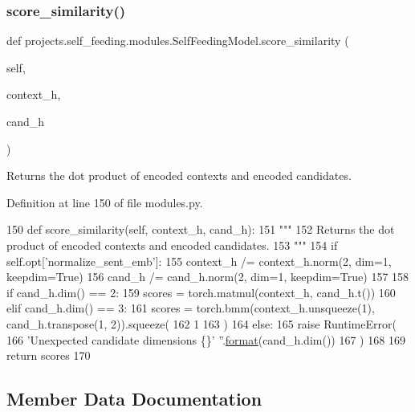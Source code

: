 \subsubsection{\texorpdfstring{score\+\_\+similarity()}{score\_similarity()}}
{\footnotesize\ttfamily def projects.\+self\+\_\+feeding.\+modules.\+Self\+Feeding\+Model.\+score\+\_\+similarity (\begin{DoxyParamCaption}\item[{}]{self,  }\item[{}]{context\+\_\+h,  }\item[{}]{cand\+\_\+h }\end{DoxyParamCaption})}

\begin{DoxyVerb}Returns the dot product of encoded contexts and encoded candidates.
\end{DoxyVerb}
 

Definition at line 150 of file modules.\+py.


\begin{DoxyCode}
150     \textcolor{keyword}{def }score\_similarity(self, context\_h, cand\_h):
151         \textcolor{stringliteral}{"""}
152 \textcolor{stringliteral}{        Returns the dot product of encoded contexts and encoded candidates.}
153 \textcolor{stringliteral}{        """}
154         \textcolor{keywordflow}{if} self.opt[\textcolor{stringliteral}{'normalize\_sent\_emb'}]:
155             context\_h /= context\_h.norm(2, dim=1, keepdim=\textcolor{keyword}{True})
156             cand\_h /= cand\_h.norm(2, dim=1, keepdim=\textcolor{keyword}{True})
157 
158         \textcolor{keywordflow}{if} cand\_h.dim() == 2:
159             scores = torch.matmul(context\_h, cand\_h.t())
160         \textcolor{keywordflow}{elif} cand\_h.dim() == 3:
161             scores = torch.bmm(context\_h.unsqueeze(1), cand\_h.transpose(1, 2)).squeeze(
162                 1
163             )
164         \textcolor{keywordflow}{else}:
165             \textcolor{keywordflow}{raise} RuntimeError(
166                 \textcolor{stringliteral}{'Unexpected candidate dimensions \{\}'} \textcolor{stringliteral}{''}.\hyperlink{namespaceparlai_1_1chat__service_1_1services_1_1messenger_1_1shared__utils_a32e2e2022b824fbaf80c747160b52a76}{format}(cand\_h.dim())
167             )
168 
169         \textcolor{keywordflow}{return} scores
170 
\end{DoxyCode}


\subsection{Member Data Documentation}
\mbox{\label{classprojects_1_1self__feeding_1_1modules_1_1SelfFeedingModel_a528f2ba6f18fc1d45c19f2a514cc120b}} 
